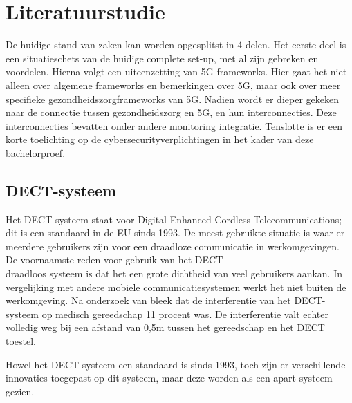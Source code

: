 \section{Literatuurstudie}%
\label{sec:literatuurstudie}

De huidige stand van zaken kan worden opgesplitst in 4 delen. Het eerste deel is een situatieschets van de huidige complete set-up, met al zijn gebreken en voordelen. Hierna volgt een uiteenzetting van 5G-frameworks. Hier gaat het niet alleen over algemene frameworks en bemerkingen over 5G, maar ook over meer specifieke gezondheidszorgframeworks van 5G. Nadien wordt er dieper gekeken naar de connectie tussen gezondheidszorg en 5G, en hun interconnecties. Deze interconnecties bevatten onder andere monitoring integratie. Tenslotte is er een korte toelichting op de cybersecurityverplichtingen in het kader van deze bachelorproef.

\subsection{DECT-systeem}
Het DECT-systeem staat voor Digital Enhanced Cordless Telecommunications; dit is een standaard in de EU sinds 1993. De meest gebruikte situatie is waar er meerdere gebruikers zijn voor een draadloze communicatie in werkomgevingen. De voornaamste reden voor gebruik van het DECT-\\draadloos systeem is dat het een grote dichtheid van veel gebruikers aankan. In vergelijking met andere mobiele communicatiesystemen werkt het niet buiten de werkomgeving. \autocite{Welinder1997} Na onderzoek van \textcite{Welinder1997} bleek dat de interferentie van het DECT-systeem op medisch gereedschap 11 procent was. De interferentie valt echter volledig weg bij een afstand van 0,5m tussen het gereedschap en het DECT toestel.


Howel het DECT-systeem een standaard is sinds 1993, toch zijn er verschillende innovaties toegepast op dit systeem, maar deze worden als een apart systeem gezien. 

